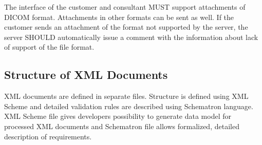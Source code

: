 \documentclass[a4paper]{article}
\begin{document}
The interface of the customer and consultant MUST support attachments of DICOM format. 
Attachments in other formats can be sent as well. If the customer sends an attachment of the 
format not supported by the server, the server SHOULD automatically issue a comment with the 
information about lack of support of the file format.

\subsection{Structure of XML Documents}

XML documents are defined in separate files. Structure is defined using XML
Scheme and detailed validation rules are described using Schematron language.
XML Scheme file gives developers possibility to generate data model for
processed XML documents and Schematron file allows formalized, detailed
description of requirements.
\end{document}
